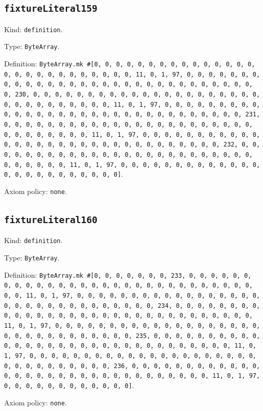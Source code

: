 \documentclass[11pt]{article}
\begin{document}
\subsection*{\texttt{fixtureLiteral159}}
\noindent Kind: \texttt{definition}.\par
\noindent Type: \texttt{ByteArray}.\par
\noindent Definition: \texttt{ByteArray.mk \#[0, 0, 0, 0, 0, 0, 0, 0, 0, 0, 0, 0, 0, 0, 0, 0, 0, 0, 0, 0, 0, 0, 0, 0, 0, 0, 0, 11, 0, 1, 97, 0, 0, 0, 0, 0, 0, 0, 0, 0, 0, 0, 0, 0, 0, 0, 0, 0, 0, 0, 0, 0, 0, 0, 0, 0, 0, 0, 0, 0, 0, 0, 230, 0, 0, 0, 0, 0, 0, 0, 0, 0, 0, 0, 0, 0, 0, 0, 0, 0, 0, 0, 0, 0, 0, 0, 0, 0, 0, 0, 0, 0, 0, 0, 11, 0, 1, 97, 0, 0, 0, 0, 0, 0, 0, 0, 0, 0, 0, 0, 0, 0, 0, 0, 0, 0, 0, 0, 0, 0, 0, 0, 0, 0, 0, 0, 0, 0, 0, 231, 0, 0, 0, 0, 0, 0, 0, 0, 0, 0, 0, 0, 0, 0, 0, 0, 0, 0, 0, 0, 0, 0, 0, 0, 0, 0, 0, 0, 0, 0, 0, 11, 0, 1, 97, 0, 0, 0, 0, 0, 0, 0, 0, 0, 0, 0, 0, 0, 0, 0, 0, 0, 0, 0, 0, 0, 0, 0, 0, 0, 0, 0, 0, 0, 0, 0, 232, 0, 0, 0, 0, 0, 0, 0, 0, 0, 0, 0, 0, 0, 0, 0, 0, 0, 0, 0, 0, 0, 0, 0, 0, 0, 0, 0, 0, 0, 0, 0, 11, 0, 1, 97, 0, 0, 0, 0, 0, 0, 0, 0, 0, 0, 0, 0, 0, 0, 0, 0, 0, 0, 0, 0, 0, 0, 0, 0]}.\par
\noindent Axiom policy: \texttt{none}.\par
\subsection*{\texttt{fixtureLiteral160}}
\noindent Kind: \texttt{definition}.\par
\noindent Type: \texttt{ByteArray}.\par
\noindent Definition: \texttt{ByteArray.mk \#[0, 0, 0, 0, 0, 0, 0, 233, 0, 0, 0, 0, 0, 0, 0, 0, 0, 0, 0, 0, 0, 0, 0, 0, 0, 0, 0, 0, 0, 0, 0, 0, 0, 0, 0, 0, 0, 0, 0, 11, 0, 1, 97, 0, 0, 0, 0, 0, 0, 0, 0, 0, 0, 0, 0, 0, 0, 0, 0, 0, 0, 0, 0, 0, 0, 0, 0, 0, 0, 0, 0, 0, 0, 0, 234, 0, 0, 0, 0, 0, 0, 0, 0, 0, 0, 0, 0, 0, 0, 0, 0, 0, 0, 0, 0, 0, 0, 0, 0, 0, 0, 0, 0, 0, 0, 0, 11, 0, 1, 97, 0, 0, 0, 0, 0, 0, 0, 0, 0, 0, 0, 0, 0, 0, 0, 0, 0, 0, 0, 0, 0, 0, 0, 0, 0, 0, 0, 0, 0, 0, 0, 235, 0, 0, 0, 0, 0, 0, 0, 0, 0, 0, 0, 0, 0, 0, 0, 0, 0, 0, 0, 0, 0, 0, 0, 0, 0, 0, 0, 0, 0, 0, 0, 11, 0, 1, 97, 0, 0, 0, 0, 0, 0, 0, 0, 0, 0, 0, 0, 0, 0, 0, 0, 0, 0, 0, 0, 0, 0, 0, 0, 0, 0, 0, 0, 0, 0, 0, 236, 0, 0, 0, 0, 0, 0, 0, 0, 0, 0, 0, 0, 0, 0, 0, 0, 0, 0, 0, 0, 0, 0, 0, 0, 0, 0, 0, 0, 0, 0, 0, 11, 0, 1, 97, 0, 0, 0, 0, 0, 0, 0, 0, 0, 0, 0, 0]}.\par
\noindent Axiom policy: \texttt{none}.\par
\end{document}

